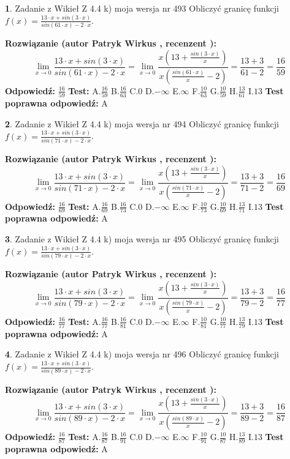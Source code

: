 \documentclass[12pt, a4paper]{article}
\theoremstyle{definition} %
\newtheorem{zad}{}
\newcommand{\zadStart}[1]{\begin{zad}#1\newline}
\newcommand{\zadStop}{\end{zad}}
\newcommand{\rozwStart}[2]{\noindent \textbf{Rozwiązanie (autor #1 , recenzent #2): }\newline}
\newcommand{\rozwStop}{\newline}
\newcommand{\odpStart}{\noindent \textbf{Odpowiedź:}\newline}
\newcommand{\odpStop}{\newline}
\newcommand{\testStart}{\noindent \textbf{Test:}\newline}
\newcommand{\testStop}{\newline}
\newcommand{\kluczStart}{\noindent \textbf{Test poprawna odpowiedź:}\newline}
\newcommand{\kluczStop}{\newline}
\begin{document}
\zadStart{Zadanie z Wikieł Z 4.4 k) moja wersja nr 493}
Obliczyć granicę funkcji $f(x)=\frac{13\cdot x +sin(3\cdot x)}{sin(61\cdot x) -2\cdot x}$.
\zadStop
\rozwStart{Patryk Wirkus}{}
$$\lim\limits_{x\to 0}\frac{13\cdot x +sin(3\cdot x)}{sin(61\cdot x) -2\cdot x}
=\lim\limits_{x\to 0}\frac{x(13+\frac{sin(3\cdot x)}{x})}{x(\frac{sin(61\cdot x)}{x}-2)}
=\frac{13+3}{61-2} = \frac{16}{59}$$
\rozwStop
\odpStart
$\frac{16}{59}$
\odpStop
\testStart
A.$\frac{16}{59}$
B.$\frac{16}{63}$
C.$0$
D.$-\infty$
E.$\infty$
F.$\frac{10}{63}$
G.$\frac{10}{59}$
H.$\frac{13}{61}$
I.$13$
\testStop
\kluczStart
A
\kluczStop



\zadStart{Zadanie z Wikieł Z 4.4 k) moja wersja nr 494}
Obliczyć granicę funkcji $f(x)=\frac{13\cdot x +sin(3\cdot x)}{sin(71\cdot x) -2\cdot x}$.
\zadStop
\rozwStart{Patryk Wirkus}{}
$$\lim\limits_{x\to 0}\frac{13\cdot x +sin(3\cdot x)}{sin(71\cdot x) -2\cdot x}
=\lim\limits_{x\to 0}\frac{x(13+\frac{sin(3\cdot x)}{x})}{x(\frac{sin(71\cdot x)}{x}-2)}
=\frac{13+3}{71-2} = \frac{16}{69}$$
\rozwStop
\odpStart
$\frac{16}{69}$
\odpStop
\testStart
A.$\frac{16}{69}$
B.$\frac{16}{73}$
C.$0$
D.$-\infty$
E.$\infty$
F.$\frac{10}{73}$
G.$\frac{10}{69}$
H.$\frac{13}{71}$
I.$13$
\testStop
\kluczStart
A
\kluczStop



\zadStart{Zadanie z Wikieł Z 4.4 k) moja wersja nr 495}
Obliczyć granicę funkcji $f(x)=\frac{13\cdot x +sin(3\cdot x)}{sin(79\cdot x) -2\cdot x}$.
\zadStop
\rozwStart{Patryk Wirkus}{}
$$\lim\limits_{x\to 0}\frac{13\cdot x +sin(3\cdot x)}{sin(79\cdot x) -2\cdot x}
=\lim\limits_{x\to 0}\frac{x(13+\frac{sin(3\cdot x)}{x})}{x(\frac{sin(79\cdot x)}{x}-2)}
=\frac{13+3}{79-2} = \frac{16}{77}$$
\rozwStop
\odpStart
$\frac{16}{77}$
\odpStop
\testStart
A.$\frac{16}{77}$
B.$\frac{16}{81}$
C.$0$
D.$-\infty$
E.$\infty$
F.$\frac{10}{81}$
G.$\frac{10}{77}$
H.$\frac{13}{79}$
I.$13$
\testStop
\kluczStart
A
\kluczStop



\zadStart{Zadanie z Wikieł Z 4.4 k) moja wersja nr 496}
Obliczyć granicę funkcji $f(x)=\frac{13\cdot x +sin(3\cdot x)}{sin(89\cdot x) -2\cdot x}$.
\zadStop
\rozwStart{Patryk Wirkus}{}
$$\lim\limits_{x\to 0}\frac{13\cdot x +sin(3\cdot x)}{sin(89\cdot x) -2\cdot x}
=\lim\limits_{x\to 0}\frac{x(13+\frac{sin(3\cdot x)}{x})}{x(\frac{sin(89\cdot x)}{x}-2)}
=\frac{13+3}{89-2} = \frac{16}{87}$$
\rozwStop
\odpStart
$\frac{16}{87}$
\odpStop
\testStart
A.$\frac{16}{87}$
B.$\frac{16}{91}$
C.$0$
D.$-\infty$
E.$\infty$
F.$\frac{10}{91}$
G.$\frac{10}{87}$
H.$\frac{13}{89}$
I.$13$
\testStop
\kluczStart
A
\kluczStop
\end{document}
